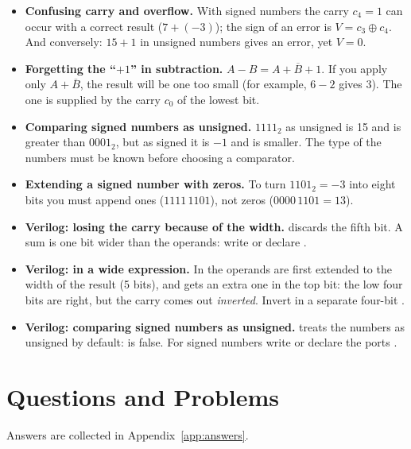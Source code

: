 \begin{warnbox}
\begin{itemize}
  \item \textbf{Confusing carry and overflow.} With signed numbers the carry $c_4=1$ can occur with a correct result ($7+(-3)$); the sign of an error is $V=c_3\oplus c_4$. And conversely: $15+1$ in unsigned numbers gives an error, yet $V=0$.
  \item \textbf{Forgetting the ``$+1$'' in subtraction.} $A-B=A+\overline{B}+1$. If you apply only $A+\overline{B}$, the result will be one too small (for example, $6-2$ gives 3). The one is supplied by the carry $c_0$ of the lowest bit.
  \item \textbf{Comparing signed numbers as unsigned.} $1111_2$ as unsigned is 15 and is greater than $0001_2$, but as signed it is $-1$ and is smaller. The type of the numbers must be known before choosing a comparator.
  \item \textbf{Extending a signed number with zeros.} To turn $1101_2=-3$ into eight bits you must append ones ($1111\,1101$), not zeros ($0000\,1101=13$).
  \item \textbf{Verilog: losing the carry because of the width.}
     discards the fifth bit. A sum is one bit wider
    than the operands: write  or declare
    \code{[4:0]}.
  \item \textbf{Verilog:  in a wide expression.} In
     the operands are first
    extended to the width of the result (5 bits), and 
    gets an extra one in the top bit: the low four bits are right, but the carry
     comes out \emph{inverted}. Invert in a separate four-bit
    .
  \item \textbf{Verilog: comparing signed numbers as unsigned.}
     treats the numbers as unsigned by default:  is false. For signed numbers write  or declare the ports .
\end{itemize}
\end{warnbox}

\section{Questions and Problems}
\label{sec:tasks-arith}

Answers are collected in Appendix~\ref{app:answers}.

